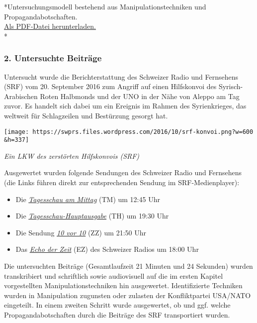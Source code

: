 *Untersuchungsmodell bestehend aus Manipulationstechniken und
Propagandabotschaften.\\
\href{https://swprs.files.wordpress.com/2018/09/propaganda-schluessel-spr.pdf}{Als
PDF-Datei herunterladen.}\\
*

\hypertarget{2-untersuchte-beitruxe4ge}{%
\subsubsection{2. Untersuchte
Beiträge}\label{2-untersuchte-beitruxe4ge}}

Untersucht wurde die Berichterstattung des Schweizer Radio und
Fernsehens (SRF) vom 20. September 2016 zum Angriff auf einen
Hilfskonvoi des Syrisch-Arabischen Roten Halbmonds und der UNO in der
Nähe von Aleppo am Tag zuvor. Es handelt sich dabei um ein Ereignis im
Rahmen des Syrienkrieges, das weltweit für Schlagzeilen und Bestürzung
gesorgt hat.

\texttt{[image: https://swprs.files.wordpress.com/2016/10/srf-konvoi.png?w=600\\\&h=337]}

\emph{Ein LKW des zerstörten Hilfskonvois (SRF)}

Ausgewertet wurden folgende Sendungen des Schweizer Radio und Fernsehens
(die Links führen direkt zur entsprechenden Sendung im
SRF-Medienplayer):

\begin{itemize}
\tightlist
\item
  Die
  \emph{\href{http://www.srf.ch/play/tv/tagesschau-am-mittag/video/tagesschau-vom-20-09-2016-1245?id=72fb2535-87a4-4f59-b22e-4e9dd7a84436}{Tagesschau
  am Mittag}} (TM) um 12:45 Uhr
\item
  Die
  \emph{\href{http://www.srf.ch/play/tv/tagesschau/video/tagesschau-vom-20-09-2016-1930?id=d6397078-c449-4f65-8cf6-599e1b16c2ef}{Tagesschau-Hauptausgabe}}
  (TH) um 19:30 Uhr
\item
  Die Sendung
  \emph{\href{http://www.srf.ch/play/tv/10vor10/video/10vor10-vom-20-09-2016?id=5fbec62e-8498-4cbe-9a1b-7eb48207b2b4}{10
  vor 10}} (ZZ) um 21:50 Uhr
\item
  Das
  \emph{\href{http://www.srf.ch/play/radio/echo-der-zeit/audio/uno-stoppt-hilfsgueter-lieferungen-nach-syrien?id=2e4fd32d-6fbb-40d0-8b17-131179be6916}{Echo
  der Zeit}} (EZ) des Schweizer Radios um 18:00 Uhr
\end{itemize}

Die untersuchten Beiträge (Gesamtlaufzeit 21 Minuten und 24 Sekunden)
wurden transkribiert und schriftlich sowie audiovisuell auf die im
ersten Kapitel vorgestellten Manipulationstechniken hin ausgewertet.
Identifizierte Techniken wurden in Manipulation zugunsten oder zulasten
der Konfliktpartei USA/NATO eingeteilt. In einem zweiten Schritt wurde
ausgewertet, ob und ggf. welche Propagandabotschaften durch die Beiträge
des SRF transportiert wurden.

